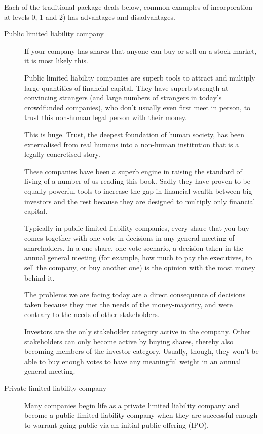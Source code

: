 Each of the traditional package deals below, common examples of incorporation  at levels 0, 1 and 2) has advantages and disadvantages.




\begin{description}
\item[Public limited liability company] If your company has shares that anyone can buy or sell on a stock market, it is most likely this. 


Public limited liability companies are superb tools to attract and multiply large quantities of financial capital. They have superb strength at convincing strangers (and large numbers of strangers in today's crowdfunded companies), who don’t usually even first meet in person, to trust this non-human legal person with their money. 


This is huge. Trust, the deepest foundation of human society, has been externalised from real humans into a non-human institution that is a legally concretised story.


These companies have been a superb engine in raising the standard of living of a number of us reading this book. Sadly they have proven to be equally powerful tools to increase the gap in financial wealth between big investors and the rest because they are designed to multiply only financial capital. 


Typically in public limited liability companies, every share that you buy comes together with one vote in decisions in any general meeting of shareholders. In a one-share, one-vote scenario, a decision taken in the annual general meeting (for example, how much to pay the executives, to sell the company, or buy another one) is the opinion with the most money behind it. 


The problems we are facing today are a direct consequence of decisions taken because they met the needs of the money-majority, and were contrary to the needs of other stakeholders.


Investors are the only stakeholder category active in the company. Other stakeholders can only become active by buying shares, thereby also becoming members of the investor category. Usually, though, they won’t be able to buy enough votes to have any meaningful weight in an annual general meeting.


\item[Private limited liability company]
Many companies begin life as a private limited liability company and become a public limited liability company when they are successful enough to warrant going public via an initial public offering (IPO). 



\end{description}
